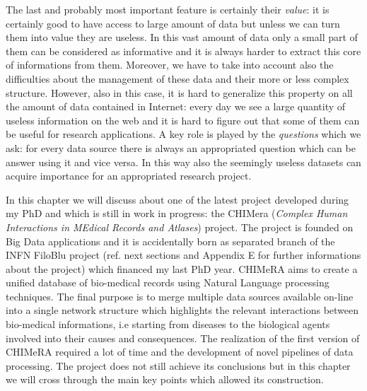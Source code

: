 \documentclass{standalone}
\begin{document}
The last and probably most important feature is certainly their \emph{value}: it is certainly good to have access to large amount of data but unless we can turn them into value they are useless.
In this vast amount of data only a small part of them can be considered as informative and it is always harder to extract this core of informations from them.
Moreover, we have to take into account also the difficulties about the management of these data and their more or less complex structure.
However, also in this case, it is hard to generalize this property on all the amount of data contained in Internet: every day we see a large quantity of useless information on the web and it is hard to figure out that some of them can be useful for research applications.
A key role is played by the \emph{questions} which we ask: for every data source there is always an appropriated question which can be answer using it and vice versa.
In this way also the seemingly useless datasets can acquire importance for an appropriated research project.

In this chapter we will discuss about one of the latest project developed during my PhD and which is still in work in progress: the CHIMera (\emph{Complex Human Interactions in MEdical Records and Atlases}) project.
The project is founded on Big Data applications and it is accidentally born as separated branch of the INFN FiloBlu project (ref. next sections and Appendix E for further informations about the project) which financed my last PhD year.
CHIMeRA aims to create a unified database of bio-medical records using Natural Language processing techniques.
The final purpose is to merge multiple data sources available on-line into a single network structure which highlights the relevant interactions between bio-medical informations, i.e starting from diseases to the biological agents involved into their causes and consequences.
The realization of the first version of CHIMeRA required a lot of time and the development of novel pipelines of data processing.
The project does not still achieve its conclusions but in this chapter we will cross through the main key points which allowed its construction.

\end{document}

